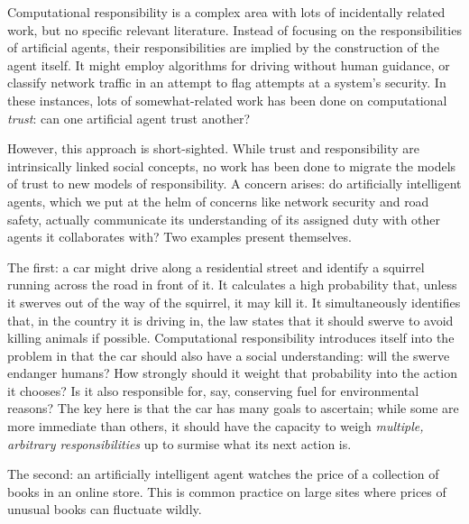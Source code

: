 \documentclass{mprop}
\begin{document}
Computational responsibility is a complex area with lots of incidentally related work, but no specific relevant literature. Instead of focusing on the responsibilities of artificial agents, their responsibilities are implied by the construction of the agent itself. It might employ algorithms for driving without human guidance, or classify network traffic in an attempt to flag attempts at a system's security. In these instances, lots of somewhat-related work has been done on computational \emph{trust}: can one artificial agent trust another?\par

However, this approach is short-sighted. While trust and responsibility are intrinsically linked social concepts, no work has been done to migrate the models of trust to new models of responsibility. A concern arises: do artificially intelligent agents, which we put at the helm of concerns like network security and road safety, actually communicate its understanding of its assigned duty with other agents it collaborates with? Two examples present themselves.\par

The first: a car might drive along a residential street and identify a squirrel running across the road in front of it. It calculates a high probability that, unless it swerves out of the way of the squirrel, it may kill it. It simultaneously identifies that, in the country it is driving in, the law states that it should swerve to avoid killing animals if possible. Computational responsibility introduces itself into the problem in that the car should also have a social understanding: will the swerve endanger humans? How strongly should it weight that probability into the action it chooses? Is it also responsible for, say, conserving fuel for environmental reasons? The key here is that the car has many goals to ascertain; while some are more immediate than others, it should have the capacity to weigh \emph{multiple, arbitrary responsibilities} up to surmise what its next action is. \par

The second: an artificially intelligent agent watches the price of a collection of books in an online store. This is common practice on large sites where prices of unusual books can fluctuate wildly. 
\end{document}
